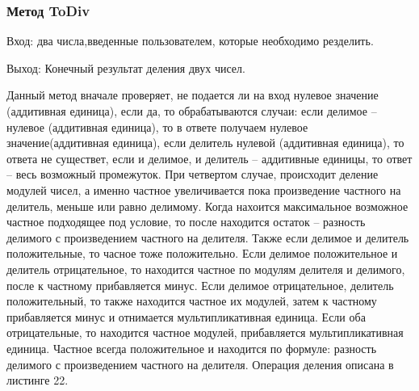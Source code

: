 \documentclass[10pt,a4paper,final]{article} %
\begin{document}
		
		
		\subsubsection{Метод ToDiv}
		
		Вход: два числа,введенные пользователем, которые необходимо резделить. 
		
		Выход: Конечный результат деления двух чисел.
		
		Данный метод вначале проверяет, не подается ли на вход нулевое значение (аддитивная единица), если да, то обрабатываются случаи: если делимое -- нулевое (аддитивная единица), то в ответе получаем нулевое значение(аддитивная единица), если делитель нулевой (аддитивная единица), то ответа не существет, если и делимое, и делитель -- аддитивные единицы, то ответ -- весь возможный промежуток. При четвертом случае, происходит деление модулей чисел, а именно частное увеличивается пока произведение частного на делитель, меньше или равно делимому. Когда нахоится максимальное возможное частное подходящее под условие, то после находится остаток -- разность делимого с произведением частного на делителя. Также если делимое и делитель положительные, то часное тоже положительно. Если делимое положительное и делитель отрицательное, то находится частное по модулям делителя и делимого,  после к частному прибавляется минус. Если делимое отрицательное, делитель положительный, то также находится частное их модулей, затем к частному прибавляется минус и отнимается мультипликативная единица. Если оба отрицательные, то находится частное модулей, прибавляется мультипликативная единица. Частное всегда положительное и находится по формуле: разность делимого с произведением частного на делителя. Операция деления описана в листинге 22.
		
\end{document}
